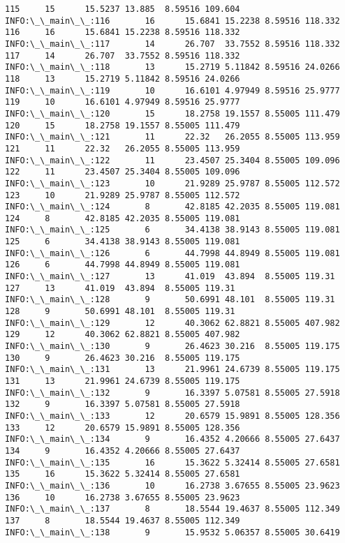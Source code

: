\documentclass[11pt]{article}
\begin{document}
\begin{Verbatim}[commandchars=\\\{\}]
115     15      15.5237 13.885  8.59516 109.604
INFO:\_\_main\_\_:116       16      15.6841 15.2238 8.59516 118.332
116     16      15.6841 15.2238 8.59516 118.332
INFO:\_\_main\_\_:117       14      26.707  33.7552 8.59516 118.332
117     14      26.707  33.7552 8.59516 118.332
INFO:\_\_main\_\_:118       13      15.2719 5.11842 8.59516 24.0266
118     13      15.2719 5.11842 8.59516 24.0266
INFO:\_\_main\_\_:119       10      16.6101 4.97949 8.59516 25.9777
119     10      16.6101 4.97949 8.59516 25.9777
INFO:\_\_main\_\_:120       15      18.2758 19.1557 8.55005 111.479
120     15      18.2758 19.1557 8.55005 111.479
INFO:\_\_main\_\_:121       11      22.32   26.2055 8.55005 113.959
121     11      22.32   26.2055 8.55005 113.959
INFO:\_\_main\_\_:122       11      23.4507 25.3404 8.55005 109.096
122     11      23.4507 25.3404 8.55005 109.096
INFO:\_\_main\_\_:123       10      21.9289 25.9787 8.55005 112.572
123     10      21.9289 25.9787 8.55005 112.572
INFO:\_\_main\_\_:124       8       42.8185 42.2035 8.55005 119.081
124     8       42.8185 42.2035 8.55005 119.081
INFO:\_\_main\_\_:125       6       34.4138 38.9143 8.55005 119.081
125     6       34.4138 38.9143 8.55005 119.081
INFO:\_\_main\_\_:126       6       44.7998 44.8949 8.55005 119.081
126     6       44.7998 44.8949 8.55005 119.081
INFO:\_\_main\_\_:127       13      41.019  43.894  8.55005 119.31
127     13      41.019  43.894  8.55005 119.31
INFO:\_\_main\_\_:128       9       50.6991 48.101  8.55005 119.31
128     9       50.6991 48.101  8.55005 119.31
INFO:\_\_main\_\_:129       12      40.3062 62.8821 8.55005 407.982
129     12      40.3062 62.8821 8.55005 407.982
INFO:\_\_main\_\_:130       9       26.4623 30.216  8.55005 119.175
130     9       26.4623 30.216  8.55005 119.175
INFO:\_\_main\_\_:131       13      21.9961 24.6739 8.55005 119.175
131     13      21.9961 24.6739 8.55005 119.175
INFO:\_\_main\_\_:132       9       16.3397 5.07581 8.55005 27.5918
132     9       16.3397 5.07581 8.55005 27.5918
INFO:\_\_main\_\_:133       12      20.6579 15.9891 8.55005 128.356
133     12      20.6579 15.9891 8.55005 128.356
INFO:\_\_main\_\_:134       9       16.4352 4.20666 8.55005 27.6437
134     9       16.4352 4.20666 8.55005 27.6437
INFO:\_\_main\_\_:135       16      15.3622 5.32414 8.55005 27.6581
135     16      15.3622 5.32414 8.55005 27.6581
INFO:\_\_main\_\_:136       10      16.2738 3.67655 8.55005 23.9623
136     10      16.2738 3.67655 8.55005 23.9623
INFO:\_\_main\_\_:137       8       18.5544 19.4637 8.55005 112.349
137     8       18.5544 19.4637 8.55005 112.349
INFO:\_\_main\_\_:138       9       15.9532 5.06357 8.55005 30.6419

\end{Verbatim}
\end{document}
